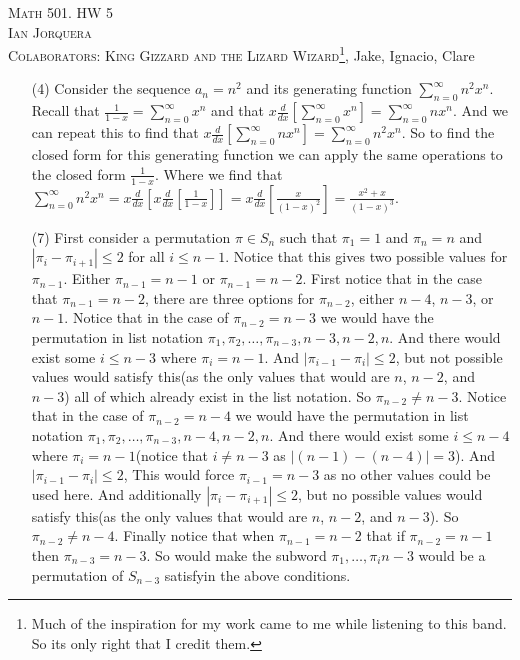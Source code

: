 \documentclass[12pt]{amsart}
\theoremstyle{definition}
\begin{document}
\begin{center}
    \textsc{Math 501. HW 5\\ Ian Jorquera\\ Colaborators: King Gizzard and the Lizard Wizard\footnote{Much of the inspiration for my work came to me while listening to this band. So its only right that I credit them.}}, Jake, Ignacio, Clare
\end{center}
\vspace{1em}


\begin{itemize}

\item[(4)] %
Consider the sequence $a_n=n^2$ and its generating function $\displaystyle{\sum_{n=0}^{\infty}n^2x^n}$. Recall that $\displaystyle{\frac{1}{1-x}}=\displaystyle{\sum_{n=0}^{\infty}x^n}$ and that $\displaystyle{x\frac{d}{dx}\left[\sum_{n=0}^{\infty}x^n \right]}=\displaystyle{\sum_{n=0}^{\infty}nx^n}$. And we can repeat this to find that $\displaystyle{x\frac{d}{dx}\left[\sum_{n=0}^{\infty}nx^n\right]}=\displaystyle{\sum_{n=0}^{\infty}n^2x^n}$. So to find the closed form for this generating function we can apply the same operations to the closed form $\frac{1}{1-x}$. Where we find that $\displaystyle{\sum_{n=0}^{\infty}n^2x^n}=\displaystyle{x\frac{d}{dx}\left[x\frac{d}{dx}\left[\frac{1}{1-x} \right] \right]}=\displaystyle{x\frac{d}{dx}\left[ \frac{x}{(1-x)^2} \right]}=\frac{x^2+x}{(1-x)^3}$.\\

\item[(7)] %
First consider a permutation $\pi\in S_n$ such that $\pi_1=1$ and $\pi_n=n$ and $|\pi_i-\pi_{i+1}|\leq 2$ for all $i\leq n-1$. Notice that this gives two possible values for $\pi_{n-1}$. Either $\pi_{n-1}=n-1$ or $\pi_{n-1}=n-2$. First notice that in the case that $\pi_{n-1}=n-2$, there are three options for $\pi_{n-2}$, either $n-4$, $n-3$, or $n-1$. Notice that in the case of $\pi_{n-2}=n-3$ we would have the permutation in list notation $\pi_1,\pi_2,\dots,\pi_{n-3},n-3,n-2,n$. And there would exist some $i\leq n-3$ where $\pi_i=n-1$. And $|\pi_{i-1}-\pi_i|\leq 2$, but not possible values would satisfy this(as the only values that would are $n$, $n-2$, and $n-3$) all of which already exist in the list notation. So $\pi_{n-2}\neq n-3$. 
Notice that in the case of $\pi_{n-2}=n-4$ we would have the permutation in list notation $\pi_1,\pi_2,\dots,\pi_{n-3},n-4,n-2,n$. And there would exist some $i\leq n-4$ where $\pi_i=n-1$(notice that $i\neq n-3$ as $|(n-1)-(n-4)|=3$). And $|\pi_{i-1}-\pi_i|\leq 2$, This would force $\pi_{i-1}=n-3$ as no other values could be used here. And additionally $|\pi_{i}-\pi_{i+1}|\leq 2$, but no possible values would satisfy this(as the only values that would are $n$, $n-2$, and $n-3$). So $\pi_{n-2}\neq n-4$. Finally notice that when $\pi_{n-1}=n-2$ that if $\pi_{n-2}=n-1$ then $\pi_{n-3}=n-3$. So would make the subword $\pi_1,\dots,\pi_i{n-3}$ would be a permutation of $S_{n-3}$ satisfyin the above conditions.\\


\end{itemize}
\end{document}
